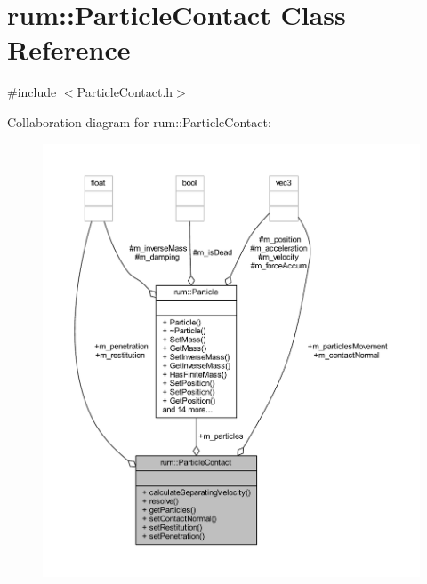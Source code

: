 \hypertarget{classrum_1_1_particle_contact}{}\section{rum\+:\+:Particle\+Contact Class Reference}
\label{classrum_1_1_particle_contact}


{\ttfamily \#include $<$Particle\+Contact.\+h$>$}



Collaboration diagram for rum\+:\+:Particle\+Contact\+:\nopagebreak
\begin{figure}[H]
\begin{center}
\leavevmode
\includegraphics[width=350pt]{classrum_1_1_particle_contact__coll__graph}
\end{center}
\end{figure}
